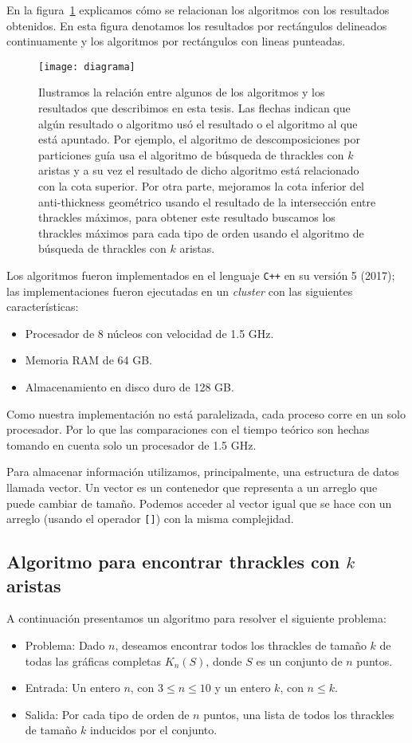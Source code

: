   En la figura~\ref{fig:diagrama} explicamos cómo se relacionan los algoritmos con los resultados obtenidos. En esta figura denotamos los resultados por rectángulos delineados continuamente y los algoritmos por rectángulos con lineas punteadas.

  \begin{figure}
    \centering
    \texttt{[image: diagrama]}
    \caption{Ilustramos la relación entre algunos de los algoritmos y los resultados que describimos en
    esta tesis. Las flechas indican que algún resultado o algoritmo usó el resultado o el algoritmo al que
    está apuntado. Por ejemplo, el algoritmo de descomposiciones por particiones guía usa el algoritmo de
    búsqueda de thrackles con $k$ aristas y a su vez el resultado de dicho algoritmo está relacionado con
    la cota superior. Por otra parte, mejoramos la cota inferior del anti-thickness geométrico usando el
    resultado de la intersección entre thrackles máximos, para obtener este resultado buscamos los
    thrackles máximos para cada tipo de orden usando el algoritmo de búsqueda de thrackles con $k$ aristas.}
    \label{fig:diagrama}
  \end{figure}
  Los algoritmos fueron implementados en el lenguaje \texttt{C++} en su versión 5 (2017);
  las implementaciones fueron ejecutadas en un \emph{cluster} con las siguientes características:
  \begin{itemize}
    \item Procesador de 8 núcleos con velocidad de 1.5 GHz.
    \item Memoria RAM de 64 GB.
    \item Almacenamiento en disco duro de 128 GB.
  \end{itemize}
  Como nuestra implementación no está paralelizada, cada proceso corre en un solo procesador. Por lo que las comparaciones con el tiempo teórico son hechas tomando en cuenta solo un procesador de 1.5 GHz.

  Para almacenar información utilizamos, principalmente, una estructura de datos llamada vector. Un vector es un contenedor que representa a un arreglo que puede cambiar de tamaño. Podemos acceder al vector igual que se hace con un arreglo (usando el operador \texttt{[]}) con la misma complejidad.

\subsection{Algoritmo para encontrar thrackles con $k$
  aristas}\label{seccion_algoritmo_kthrackles}
  A continuación presentamos un algoritmo para resolver el siguiente problema:
  \begin{itemize}
    \item[] Problema: Dado $n$, deseamos encontrar todos los thrackles de tamaño $k$ de todas las gráficas completas $K_n(S)$, donde $S$ es un conjunto de $n$ puntos.
    \item[] Entrada: Un entero $n$, con $ 3 \leq n \leq 10$ y un entero $k$, con $ n \leq
    k$.
    \item[] Salida: Por cada tipo de orden de $n$ puntos, una lista de todos los thrackles de tamaño $k$ inducidos por el conjunto.
  \end{itemize}

